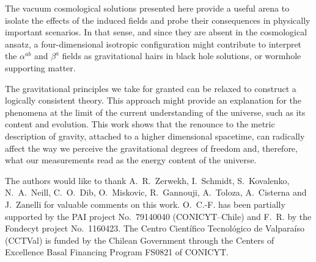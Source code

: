 \documentclass[aps,prd,12pt,superscriptaddress,showpacs,showkeys,longbibliography,reprint,nofootinbib]{revtex4-1}
\begin{document}
The vacuum cosmological solutions presented here provide a useful arena to isolate the effects of the induced fields and probe their consequences in physically important scenarios. In that sense, and since they are absent in the cosmological ansatz, a four-dimensional isotropic configuration might contribute to interpret the $\alpha^{ab}$ and $\beta^a$ fields as gravitational hairs in black hole solutions, or wormhole supporting matter. 

The gravitational principles we take for granted can be relaxed to construct a logically consistent theory. This approach might provide an explanation for the phenomena at the limit of the current understanding of the universe, such as its content and evolution. This work shows that the renounce to the metric description of gravity, attached to a higher dimensional spacetime, can radically affect the way we perceive the gravitational degrees of freedom and, therefore, what our measurements read as the energy content of the universe. 





\begin{acknowledgments}
  The authors would like to thank A.~R.~Zerwekh, I.~Schmidt,
  S.~Kovalenko, N.~A.~Neill, C.~O.~Dib, O.~Miskovic, R.~Gannouji,
  A.~Toloza, A.~Cisterna and J.~Zanelli for valuable comments on this
  work. \mbox{O.~C.-F.} has been partially supported by the PAI
  project No.~79140040 (CONICYT--Chile) and F.~R. by the Fondecyt
  project No.~1160423. The Centro Cient\'ifico Tecnol\'ogico de
  Valpara\'iso (CCTVal) is funded by the Chilean Government through
  the Centers of Excellence Basal Financing Program FS0821 of CONICYT.
\end{acknowledgments}
\end{document}
